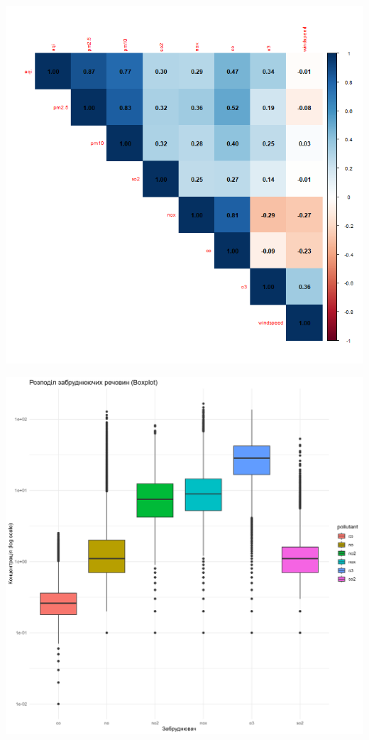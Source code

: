\documentclass[./report.tex]{subfiles}
\begin{document}
\begin{enumerate}
    \includegraphics[width=6in]{plots/question2/air_corr_matrix.png}
    
    \includegraphics[width=6in]{plots/question2/boxplot_pollutants.png}
    

\end{enumerate}
\end{document}
